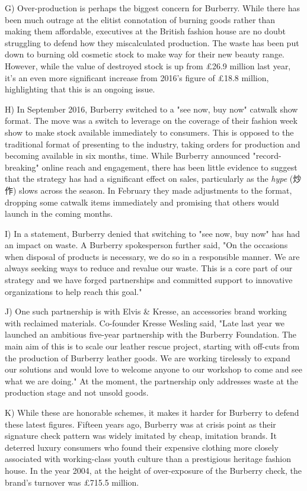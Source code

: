 \documentclass[UTF8,11pt]{ctexart}
\begin{document}
G) Over-production is perhaps the biggest concern for Burberry. While there has been much outrage at the elitist connotation of burning goods rather than making them affordable, executives at the British fashion house are no doubt struggling to defend how they miscalculated production. The waste has been put down to burning old cosmetic stock to make way for their new beauty range. However, while the value of destroyed stock is up from £26.9 million last year, it's an even more significant increase from 2016's figure of £18.8 million, highlighting that this is an ongoing issue.


H) In September 2016, Burberry switched to a "see now, buy now" catwalk show format. The move was a switch to leverage on the coverage of their fashion week show to make stock available immediately to consumers. This is opposed to the traditional format of presenting to the industry, taking orders for production and becoming available in six months, time. While Burberry announced "record-breaking" online reach and engagement, there has been little evidence to suggest that the strategy has had a significant effect on sales, particularly as the \textit{hype }(炒作) slows across the season. In February they made adjustments to the format, dropping some catwalk items immediately and promising that others would launch in the coming months.


I) In a statement, Burberry denied that switching to "see now, buy now" has had an impact on waste. A Burberry spokesperson further said, "On the occasions when disposal of products is necessary, we do so in a responsible manner. We are always seeking ways to reduce and revalue our waste. This is a core part of our strategy and we have forged partnerships and committed support to innovative organizations to help reach this goal."


J) One such partnership is with Elvis \& Kresse, an accessories brand working with reclaimed materials. Co-founder Kresse Wesling said, "Late last year we launched an ambitious five-year partnership with the Burberry Foundation. The main aim of this is to scale our leather rescue project, starting with off-cuts from the production of Burberry leather goods. We are working tirelessly to expand our solutions and would love to welcome anyone to our workshop to come and see what we are doing." At the moment, the partnership only addresses waste at the production stage and not unsold goods.


K) While these are honorable schemes, it makes it harder for Burberry to defend these latest figures. Fifteen years ago, Burberry was at crisis point as their signature check pattern was widely imitated by cheap, imitation brands. It deterred luxury consumers who found their expensive clothing more closely associated with working-class youth culture than a prestigious heritage fashion house. In the year 2004, at the height of over-exposure of the Burberry check, the brand's turnover was £715.5 million.
\end{document}
